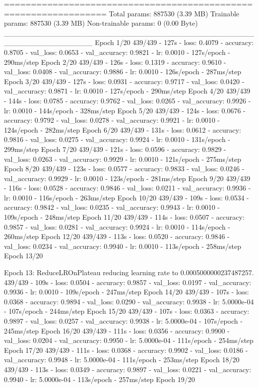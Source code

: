 \documentclass[11pt, a4paper]{article} %
\begin{document}
=================================================================
Total params: 887530 (3.39 MB)
Trainable params: 887530 (3.39 MB)
Non-trainable params: 0 (0.00 Byte)
_________________________________________________________________
Epoch 1/20
439/439 - 127s - loss: 0.4079 - accuracy: 0.8705 - val_loss: 0.0653 - val_accuracy: 0.9821 - lr: 0.0010 - 127s/epoch - 290ms/step
Epoch 2/20
439/439 - 126s - loss: 0.1319 - accuracy: 0.9610 - val_loss: 0.0408 - val_accuracy: 0.9886 - lr: 0.0010 - 126s/epoch - 287ms/step
Epoch 3/20
439/439 - 127s - loss: 0.0931 - accuracy: 0.9717 - val_loss: 0.0420 - val_accuracy: 0.9871 - lr: 0.0010 - 127s/epoch - 290ms/step
Epoch 4/20
439/439 - 144s - loss: 0.0785 - accuracy: 0.9762 - val_loss: 0.0265 - val_accuracy: 0.9926 - lr: 0.0010 - 144s/epoch - 328ms/step
Epoch 5/20
439/439 - 124s - loss: 0.0676 - accuracy: 0.9792 - val_loss: 0.0278 - val_accuracy: 0.9921 - lr: 0.0010 - 124s/epoch - 282ms/step
Epoch 6/20
439/439 - 131s - loss: 0.0612 - accuracy: 0.9816 - val_loss: 0.0275 - val_accuracy: 0.9924 - lr: 0.0010 - 131s/epoch - 299ms/step
Epoch 7/20
439/439 - 121s - loss: 0.0596 - accuracy: 0.9829 - val_loss: 0.0263 - val_accuracy: 0.9929 - lr: 0.0010 - 121s/epoch - 275ms/step
Epoch 8/20
439/439 - 123s - loss: 0.0577 - accuracy: 0.9833 - val_loss: 0.0246 - val_accuracy: 0.9929 - lr: 0.0010 - 123s/epoch - 281ms/step
Epoch 9/20
439/439 - 116s - loss: 0.0528 - accuracy: 0.9846 - val_loss: 0.0211 - val_accuracy: 0.9936 - lr: 0.0010 - 116s/epoch - 263ms/step
Epoch 10/20
439/439 - 109s - loss: 0.0534 - accuracy: 0.9842 - val_loss: 0.0235 - val_accuracy: 0.9943 - lr: 0.0010 - 109s/epoch - 248ms/step
Epoch 11/20
439/439 - 114s - loss: 0.0507 - accuracy: 0.9857 - val_loss: 0.0281 - val_accuracy: 0.9924 - lr: 0.0010 - 114s/epoch - 260ms/step
Epoch 12/20
439/439 - 113s - loss: 0.0520 - accuracy: 0.9846 - val_loss: 0.0234 - val_accuracy: 0.9940 - lr: 0.0010 - 113s/epoch - 258ms/step
Epoch 13/20

Epoch 13: ReduceLROnPlateau reducing learning rate to 0.0005000000237487257.
439/439 - 109s - loss: 0.0504 - accuracy: 0.9857 - val_loss: 0.0197 - val_accuracy: 0.9936 - lr: 0.0010 - 109s/epoch - 247ms/step
Epoch 14/20
439/439 - 107s - loss: 0.0368 - accuracy: 0.9894 - val_loss: 0.0290 - val_accuracy: 0.9938 - lr: 5.0000e-04 - 107s/epoch - 244ms/step
Epoch 15/20
439/439 - 107s - loss: 0.0363 - accuracy: 0.9897 - val_loss: 0.0257 - val_accuracy: 0.9938 - lr: 5.0000e-04 - 107s/epoch - 245ms/step
Epoch 16/20
439/439 - 111s - loss: 0.0356 - accuracy: 0.9900 - val_loss: 0.0204 - val_accuracy: 0.9950 - lr: 5.0000e-04 - 111s/epoch - 254ms/step
Epoch 17/20
439/439 - 111s - loss: 0.0368 - accuracy: 0.9902 - val_loss: 0.0186 - val_accuracy: 0.9948 - lr: 5.0000e-04 - 111s/epoch - 253ms/step
Epoch 18/20
439/439 - 113s - loss: 0.0349 - accuracy: 0.9897 - val_loss: 0.0221 - val_accuracy: 0.9940 - lr: 5.0000e-04 - 113s/epoch - 257ms/step
Epoch 19/20
\end{document}
